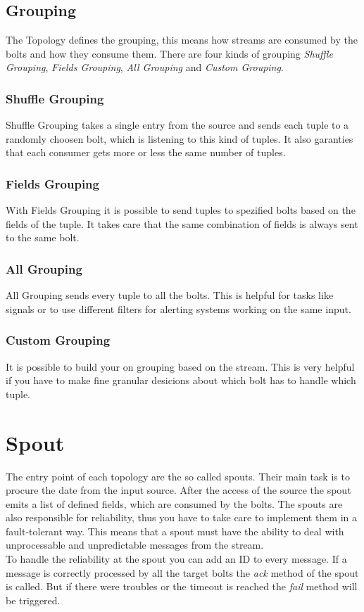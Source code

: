 \subsection{Grouping}
The Topology defines the grouping, this means how streams are consumed by the bolts and how they consume them.
There are four kinds of grouping \textit{Shuffle Grouping}, \textit{Fields Grouping},
\textit{All Grouping} and \textit{Custom Grouping}.

\subsubsection{Shuffle Grouping}
Shuffle Grouping takes a single entry from the source and sends each tuple to a randomly choosen bolt,
which is listening to this kind of tuples. It also garanties that each consumer gets more or less the same number of tuples.

\subsubsection{Fields Grouping}
With Fields Grouping it is possible to send tuples to spezified bolts based on the fields of the tuple.
It takes care that the same combination of fields is always sent to the same bolt.

\subsubsection{All Grouping}
All Grouping sends every tuple to all the bolts. This is helpful for tasks like signals or to
use different filters for alerting systems working on the same input.

\subsubsection{Custom Grouping}
It is possible to build your on grouping based on the stream. This is very helpful if you have to make
fine granular desicions about which bolt has to handle which tuple.


\newpage

\section{Spout}
The entry point of each topology are the so called spouts. Their main task is to procure the date from the input source.
After the access of the source the spout emits a list of defined fields, which are consumed by the bolts.
The spouts are also responsible for reliability,
thus you have to take care to implement them in a fault-tolerant way. This means that a spout must have the
ability to deal with unprocessable and unpredictable messages from the stream.\\
To handle the reliability at the spout you can add an ID to every message. If a message is correctly processed  by
all the target bolts the \textit{ack} method of the spout is called. But if there were troubles or the timeout is
reached the \textit{fail} method will be triggered.

